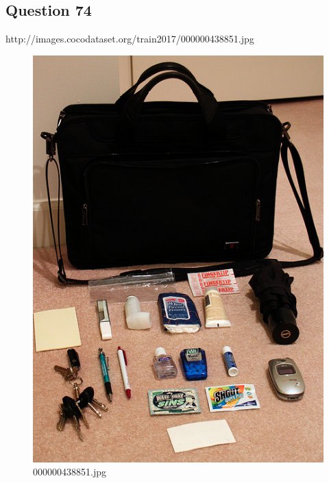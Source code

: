 \subsection*{Question 74}
http://images.cocodataset.org/train2017/000000438851.jpg
\begin{figure}[h]
    \centering
    \includegraphics[width=0.8\linewidth]{../image set/hard/000000438851.jpg}
    \caption{000000438851.jpg}
\end{figure}
